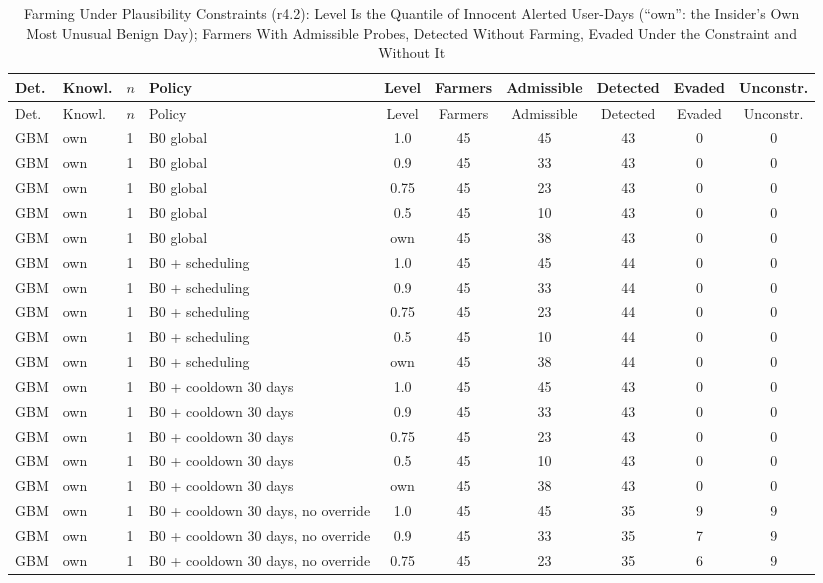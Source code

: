 \begin{longtable}{lllp{4.4cm}cccccc}
\caption{Farming Under Plausibility Constraints (r4.2): Level Is the Quantile of Innocent Alerted User-Days (``own'': the Insider's Own Most Unusual Benign Day); Farmers With Admissible Probes, Detected Without Farming, Evaded Under the Constraint and Without It\label{tab:e-m2-r42}}\\
\toprule
Det. & Knowl. & $n$ & Policy & Level & Farmers & Admissible & Detected & Evaded & Unconstr. \\
\midrule
\endfirsthead
\toprule
Det. & Knowl. & $n$ & Policy & Level & Farmers & Admissible & Detected & Evaded & Unconstr. \\
\midrule
\endhead
GBM & own & 1 & B0 global & 1.0 & 45 & 45 & 43 & 0 & 0 \\
GBM & own & 1 & B0 global & 0.9 & 45 & 33 & 43 & 0 & 0 \\
GBM & own & 1 & B0 global & 0.75 & 45 & 23 & 43 & 0 & 0 \\
GBM & own & 1 & B0 global & 0.5 & 45 & 10 & 43 & 0 & 0 \\
GBM & own & 1 & B0 global & own & 45 & 38 & 43 & 0 & 0 \\
GBM & own & 1 & B0 + scheduling & 1.0 & 45 & 45 & 44 & 0 & 0 \\
GBM & own & 1 & B0 + scheduling & 0.9 & 45 & 33 & 44 & 0 & 0 \\
GBM & own & 1 & B0 + scheduling & 0.75 & 45 & 23 & 44 & 0 & 0 \\
GBM & own & 1 & B0 + scheduling & 0.5 & 45 & 10 & 44 & 0 & 0 \\
GBM & own & 1 & B0 + scheduling & own & 45 & 38 & 44 & 0 & 0 \\
GBM & own & 1 & B0 + cooldown 30 days & 1.0 & 45 & 45 & 43 & 0 & 0 \\
GBM & own & 1 & B0 + cooldown 30 days & 0.9 & 45 & 33 & 43 & 0 & 0 \\
GBM & own & 1 & B0 + cooldown 30 days & 0.75 & 45 & 23 & 43 & 0 & 0 \\
GBM & own & 1 & B0 + cooldown 30 days & 0.5 & 45 & 10 & 43 & 0 & 0 \\
GBM & own & 1 & B0 + cooldown 30 days & own & 45 & 38 & 43 & 0 & 0 \\
GBM & own & 1 & B0 + cooldown 30 days, no override & 1.0 & 45 & 45 & 35 & 9 & 9 \\
GBM & own & 1 & B0 + cooldown 30 days, no override & 0.9 & 45 & 33 & 35 & 7 & 9 \\
GBM & own & 1 & B0 + cooldown 30 days, no override & 0.75 & 45 & 23 & 35 & 6 & 9 \\

\end{longtable}
